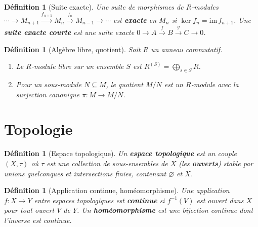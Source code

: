 \documentclass[a4paper,12pt]{book}
\newtheorem{definition}[theoreme]{Définition}
\begin{document}
\begin{definition}[Suite exacte]\label{def:rappel-suite-exacte}
Une suite de morphismes de $R$-modules
$\cdots \to M_{n+1} \xrightarrow{f_{n+1}} M_n
\xrightarrow{f_n} M_{n-1} \to \cdots$
est \textbf{exacte} en $M_n$ si $\ker f_n = \mathrm{im}\, f_{n+1}$.
Une \textbf{suite exacte courte} est une suite exacte
$0 \to A \xrightarrow{f} B \xrightarrow{g} C \to 0$.
\end{definition}

\begin{definition}[Algèbre libre, quotient]\label{def:rappel-algebre-libre}
Soit $R$ un anneau commutatif.
\begin{enumerate}[label=(\roman*)]
\item Le $R$-module libre sur un ensemble $S$ est
      $R^{(S)} = \bigoplus_{s \in S} R$.
\item Pour un sous-module $N \subseteq M$, le quotient $M/N$ est
      un $R$-module avec la surjection canonique $\pi \colon M \to M/N$.
\end{enumerate}
\end{definition}


\section{Topologie}\label{sec:rappels-topologie}


\begin{definition}[Espace topologique]\label{def:rappel-topologique}
Un \textbf{espace topologique} est un couple $(X, \tau)$ où $\tau$
est une collection de sous-ensembles de $X$ (les \textbf{ouverts})
stable par unions quelconques et intersections finies, contenant
$\varnothing$ et $X$.
\end{definition}

\begin{definition}[Application continue, homéomorphisme]
\label{def:rappel-continue}
Une application $f \colon X \to Y$ entre espaces topologiques est
\textbf{continue} si $f^{-1}(V)$ est ouvert dans $X$ pour tout
ouvert $V$ de $Y$.  Un \textbf{homéomorphisme} est une bijection
continue dont l'inverse est continue.
\end{definition}
\end{document}
